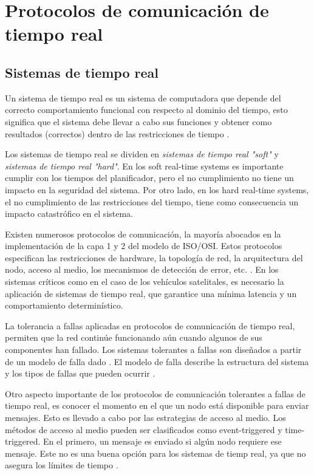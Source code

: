 \section{Protocolos de comunicación de tiempo real}
\subsection{Sistemas de tiempo real}
Un sistema de tiempo real es un sistema de computadora que depende del correcto comportamiento funcional con respecto al dominio del tiempo, esto significa que el sistema debe llevar a cabo sus funciones y obtener como resultados (correctos) dentro de las restricciones de tiempo \citep{Lisner07}.

Los sistemas de tiempo real se dividen en \textit{sistemas de tiempo real "soft"} y \textit{sistemas de tiempo real "hard"}. En los soft real-time systems es importante cumplir con los tiempos del planificador, pero el no cumplimiento no tiene un impacto en la seguridad del sistema. Por otro lado, en los hard real-time systems, el no cumplimiento de las restricciones del tiempo, tiene como consecuencia un impacto catastrófico en el sistema.

Existen numerosos protocolos de comunicación, la mayoría abocados en  la implementación de la capa 1 y 2 del modelo de ISO/OSI. Estos protocolos especifican las restricciones de hardware, la topología de red, la arquitectura del nodo, acceso al medio, los mecanismos de detección  de error, etc. \citep{Lisner07}. En los sistemas críticos como en el caso de los vehículos satelitales, es necesario la aplicación de sistemas de tiempo real, que garantice una mínima latencia y un comportamiento determinístico.

La tolerancia a fallas aplicadas en protocolos de comunicación de tiempo real, permiten que la red continúe funcionando aún cuando algunos de sus componentes han fallado. Los sistemas tolerantes a fallas son diseñados a partir de un modelo de falla dado \citep{Lisner07}. El modelo de falla describe la estructura del sistema y los tipos de fallas que pueden ocurrir \citep{Lisner07}.

Otro aspecto importante de los protocolos de comunicación tolerantes a fallas de tiempo real, es conocer el momento en el que un nodo está disponible para enviar mensajes. Esto es llevado a cabo por las estrategias de acceso al medio. Los métodos de acceso al medio pueden ser clasificados como event-triggered y time-triggered. En el primero, un mensaje es enviado si algún nodo requiere ese mensaje. Este no es una buena opción para los sistemas de tiemp real, ya que no asegura los límites de tiempo \citep{Lisner07}.

